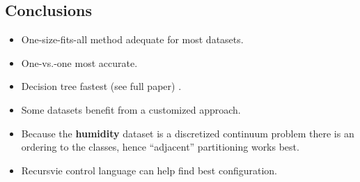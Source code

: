 \documentclass[a0,landscape]{a0poster}
\begin{document}
\begin{multicols}{4}
\section*{Conclusions}
\begin{itemize}
	\item One-size-fits-all method adequate for most datasets.
	\item One-vs.-one most accurate.
	\item Decision tree fastest (see full paper) \citep{Mills2018}.
	\item Some datasets benefit from a customized approach.
	\item Because the {\bf humidity} dataset is a discretized continuum problem there is an ordering to the classes, hence ``adjacent'' partitioning works best.
	\item Recursvie control language can help find best configuration.
\end{itemize}



{\small

}


\end{multicols}
\end{document}
